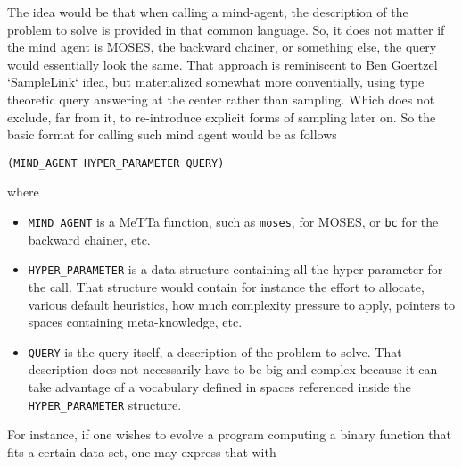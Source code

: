 \documentclass[]{report}
\begin{document}
The idea would be that when calling a mind-agent, the description of
the problem to solve is provided in that common language.  So, it does
not matter if the mind agent is MOSES, the backward chainer, or
something else, the query would essentially look the same.  That
approach is reminiscent to Ben Goertzel `SampleLink` idea, but
materialized somewhat more conventially, using type theoretic query
answering at the center rather than sampling.  Which does not exclude,
far from it, to re-introduce explicit forms of sampling later on.  So
the basic format for calling such mind agent would be as follows

\begin{verbatim}
(MIND_AGENT HYPER_PARAMETER QUERY)
\end{verbatim}
where
\begin{itemize}
\item \texttt{MIND_AGENT} is a MeTTa function, such as \texttt{moses},
for MOSES, or \texttt{bc} for the backward chainer, etc.
\item \texttt{HYPER_PARAMETER} is a data structure containing all the
  hyper-parameter for the call.  That structure would contain for
  instance the effort to allocate, various default heuristics, how
  much complexity pressure to apply, pointers to spaces containing
  meta-knowledge, etc.
\item \texttt{QUERY} is the query itself, a description of the problem to
  solve.  That description does not necessarily have to be big and
  complex because it can take advantage of a vocabulary defined in
  spaces referenced inside the \texttt{HYPER_PARAMETER} structure.
\end{itemize}

For instance, if one wishes to evolve a program computing a binary
function that fits a certain data set, one may express that with
\end{document}
